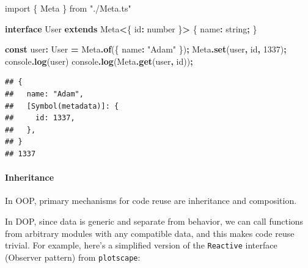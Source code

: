 \documentclass[
]{book}
\newenvironment{Shaded}{\begin{snugshade}}{\end{snugshade}}
\newcommand{\BuiltInTok}[1]{#1}
\newcommand{\DataTypeTok}[1]{\textcolor[rgb]{0.13,0.29,0.53}{#1}}
\newcommand{\DecValTok}[1]{\textcolor[rgb]{0.00,0.00,0.81}{#1}}
\newcommand{\FunctionTok}[1]{\textcolor[rgb]{0.13,0.29,0.53}{\textbf{#1}}}
\newcommand{\ImportTok}[1]{#1}
\newcommand{\KeywordTok}[1]{\textcolor[rgb]{0.13,0.29,0.53}{\textbf{#1}}}
\newcommand{\NormalTok}[1]{#1}
\newcommand{\OperatorTok}[1]{\textcolor[rgb]{0.81,0.36,0.00}{\textbf{#1}}}
\newcommand{\StringTok}[1]{\textcolor[rgb]{0.31,0.60,0.02}{#1}}
\newcommand{\VerbatimStringTok}[1]{\textcolor[rgb]{0.31,0.60,0.02}{#1}}
\theoremstyle{definition}
\theoremstyle{definition}
\theoremstyle{definition}
\theoremstyle{definition}
\theoremstyle{remark}
\begin{document}
\begin{Shaded}
\begin{Highlighting}[]
\ImportTok{import}\NormalTok{ \{ Meta \} }\ImportTok{from} \StringTok{"./Meta.ts"}

\KeywordTok{interface}\NormalTok{ User }\KeywordTok{extends}\NormalTok{ Meta}\OperatorTok{\textless{}}\NormalTok{\{ id}\OperatorTok{:} \DataTypeTok{number}\NormalTok{ \}}\OperatorTok{\textgreater{}}\NormalTok{ \{}
\NormalTok{  name}\OperatorTok{:} \DataTypeTok{string}\OperatorTok{;}
\NormalTok{\}}

\KeywordTok{const}\NormalTok{ user}\OperatorTok{:}\NormalTok{ User }\OperatorTok{=}\NormalTok{ Meta}\OperatorTok{.}\FunctionTok{of}\NormalTok{(\{ name}\OperatorTok{:} \StringTok{"Adam"}\NormalTok{ \})}\OperatorTok{;}
\NormalTok{Meta}\OperatorTok{.}\FunctionTok{set}\NormalTok{(user}\OperatorTok{,} \VerbatimStringTok{\textasciigrave{}id\textasciigrave{}}\OperatorTok{,} \DecValTok{1337}\NormalTok{)}\OperatorTok{;}
\BuiltInTok{console}\OperatorTok{.}\FunctionTok{log}\NormalTok{(user)}
\BuiltInTok{console}\OperatorTok{.}\FunctionTok{log}\NormalTok{(Meta}\OperatorTok{.}\FunctionTok{get}\NormalTok{(user}\OperatorTok{,} \VerbatimStringTok{\textasciigrave{}id\textasciigrave{}}\NormalTok{))}\OperatorTok{;}
\end{Highlighting}
\end{Shaded}

\begin{verbatim}
## {
##   name: "Adam",
##   [Symbol(metadata)]: {
##     id: 1337,
##   },
## }
## 1337
\end{verbatim}

\paragraph{Inheritance}\label{inheritance-1}

In OOP, primary mechanisms for code reuse are inheritance and composition.

In DOP, since data is generic and separate from behavior, we can call functions from arbitrary modules with any compatible data, and this makes code reuse trivial. For example, here's a simplified version of the \texttt{Reactive} interface (Observer pattern) from \texttt{plotscape}:
\end{document}
